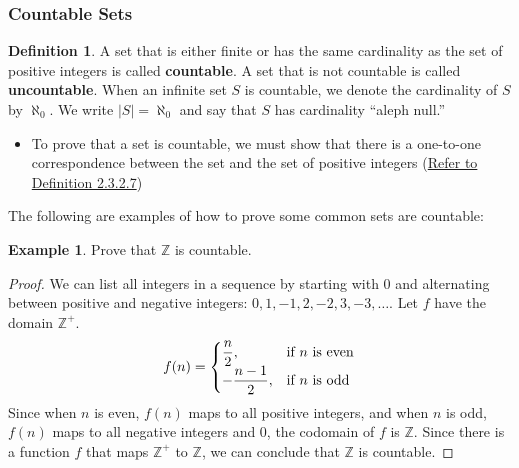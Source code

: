\documentclass[article, 11pt]{article}
\theoremstyle{definition}
\newtheorem{example}{Example}
\newtheorem{definition}{Definition}[subsubsection]
\newcommand{\df}{\displaystyle\frac} %
\newcommand{\ints}{\mathbb{Z}}
\begin{document}
    \subsubsection{Countable Sets}
    \begin{definition}
        A set that is either finite or has the same cardinality as the set of positive integers is called \textbf{countable}. A set that is not countable is called \textbf{uncountable}. When an infinite set $S$ is countable, we denote the cardinality of $S$ by $\aleph_0$. We write $|S| = \aleph_0$ and say that $S$ has cardinality ``aleph null.''
        \begin{itemize}
            \item To prove that a set is countable, we must show that there is a one-to-one correspondence between the set and the set of positive integers (\hyperref[def:one-to-one-correspondence]{Refer to Definition 2.3.2.7})
        \end{itemize}
    \end{definition}
    The following are examples of how to prove some common sets are countable:
    \begin{example}
        Prove that $\ints$ is countable. \\
        \begin{proof}
            We can list all integers in a sequence by starting with 0 and alternating between positive and negative integers: $0, 1, -1, 2, -2, 3, -3, \dots$. Let $f$ have the domain $\ints^+$.
            \begin{equation*}
                f(n) = \begin{cases}
                            \df{n}{2}, & \text{if } n \text{ is even} \cr
                            -\df{n-1}{2}, & \text{if } n \text{ is odd}
                        \end{cases}
            \end{equation*}
            Since when $n$ is even, $f(n)$ maps to all positive integers, and when $n$ is odd, $f(n)$ maps to all negative integers and 0, the codomain of $f$ is $\ints$. Since there is a function $f$ that maps $\ints^+$ to $\ints$, we can conclude that $\ints$ is countable.
        \end{proof}
    \end{example}
\end{document}
